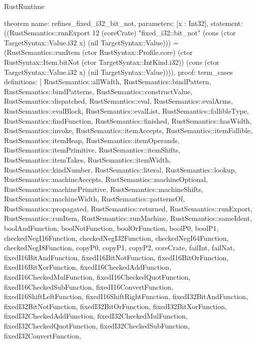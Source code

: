\begin{lexlean}{RustRuntime}
\begin{semanticmodule}
theorem{
  name: refines_fixed_i32_bit_not,
  parameters: [x : Int32],
  statement: ((RustSemantics::runExport 12 (coreCrate) "fixed_i32::bit_not" (cons (ctor TargetSyntax::Value.i32 x) (nil TargetSyntax::Value))) = (RustSemantics::runItem (ctor RustSyntax::Profile.core) (ctor RustSyntax::Item.bitNot (ctor TargetSyntax::IntKind.i32)) (cons (ctor TargetSyntax::Value.i32 x) (nil TargetSyntax::Value)))),
  proof: term_cases{
    definitions: [
      RustSemantics::allWidth,
      RustSemantics::bindPattern,
      RustSemantics::bindPatterns,
      RustSemantics::constructValue,
      RustSemantics::dispatched,
      RustSemantics::eval,
      RustSemantics::evalArms,
      RustSemantics::evalBlock,
      RustSemantics::evalList,
      RustSemantics::fallibleType,
      RustSemantics::findFunction,
      RustSemantics::finished,
      RustSemantics::hasWidth,
      RustSemantics::invoke,
      RustSemantics::itemAccepts,
      RustSemantics::itemFallible,
      RustSemantics::itemHeap,
      RustSemantics::itemOperands,
      RustSemantics::itemPrimitive,
      RustSemantics::itemShifts,
      RustSemantics::itemTakes,
      RustSemantics::itemWidth,
      RustSemantics::kindNumber,
      RustSemantics::literal,
      RustSemantics::lookup,
      RustSemantics::machineAccepts,
      RustSemantics::machineOptional,
      RustSemantics::machinePrimitive,
      RustSemantics::machineShifts,
      RustSemantics::machineWidth,
      RustSemantics::patternsOf,
      RustSemantics::propagated,
      RustSemantics::returned,
      RustSemantics::runExport,
      RustSemantics::runItem,
      RustSemantics::runMachine,
      RustSemantics::sameIdent,
      boolAndFunction,
      boolNotFunction,
      boolOrFunction,
      boolP0,
      boolP1,
      checkedNegI16Function,
      checkedNegI32Function,
      checkedNegI64Function,
      checkedNegI8Function,
      copyP0,
      copyP1,
      copyP2,
      coreCrate,
      failInt,
      failNat,
      fixedI16BitAndFunction,
      fixedI16BitNotFunction,
      fixedI16BitOrFunction,
      fixedI16BitXorFunction,
      fixedI16CheckedAddFunction,
      fixedI16CheckedMulFunction,
      fixedI16CheckedQuotFunction,
      fixedI16CheckedSubFunction,
      fixedI16ConvertFunction,
      fixedI16ShiftLeftFunction,
      fixedI16ShiftRightFunction,
      fixedI32BitAndFunction,
      fixedI32BitNotFunction,
      fixedI32BitOrFunction,
      fixedI32BitXorFunction,
      fixedI32CheckedAddFunction,
      fixedI32CheckedMulFunction,
      fixedI32CheckedQuotFunction,
      fixedI32CheckedSubFunction,
      fixedI32ConvertFunction,
}}
\end{semanticmodule}
\end{lexlean}
